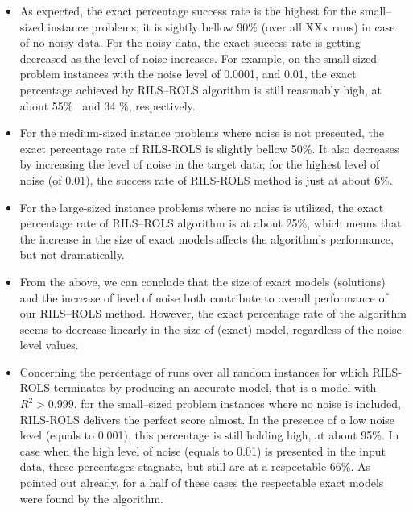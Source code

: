 \documentclass[a4paper,12pt]{elsarticle}
\begin{document}
\begin{itemize}
	\item   As expected, the exact percentage success rate is the highest for the small--sized instance problems; it is sightly bellow 90\% (over all XXx runs) in case of no-noisy data. For the noisy data, the exact success rate is getting decreased as the level of noise increases. For example, on the small-sized problem instances with the noise level  of 0.0001, and 0.01, the exact percentage achieved by \textsc{RILS}--\textsc{ROLS} algorithm is still reasonably high, at about 55\%~ and 34 \%, respectively. 
	\item For the medium-sized instance problems where noise is not presented, the exact percentage rate of \textsc{RILS}-\textsc{ROLS} is slightly bellow 50\%. It also decreases by increasing the level of noise in the target data; for the highest level of noise (of 0.01), the success rate of \textsc{RILS}-\textsc{ROLS} method is just at about 6\%. 
	\item For the large-sized instance problems where no noise is utilized, the exact percentage rate of \textsc{RILS}--\textsc{ROLS} algorithm is at about 25\%, which means that the increase in the size of exact models affects the algorithm's performance, but not dramatically.  
	
	\item From the above, we can conclude that the size of exact models (solutions) and the increase of   level of noise both contribute to overall performance of our \textsc{RILS}--\textsc{ROLS} method. However, the exact percentage rate of the algorithm seems to decrease linearly  in the size of (exact) model, regardless of the noise level values.
	
	\item Concerning  the percentage of  runs over all random instances for which \textsc{RILS-ROLS} terminates by producing an accurate model, that is a model with $R^2 > 0.999$, for the small--sized problem instances where no noise is included, \textsc{RILS}-\textsc{ROLS} delivers  the perfect score almost. In the presence of a low noise level (equals to 0.001), this percentage  is still holding high, at about 95\%. In case when the high level of noise (equals to 0.01) is presented in the input data, these percentages stagnate, but still are at a respectable 66\%. %
	As  pointed out already, for a half of these cases the respectable exact models were found by the algorithm.
	

\end{itemize}
\end{document}
